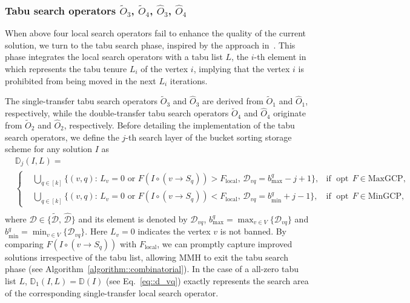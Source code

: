 \documentclass[12pt, a4paper]{article}%
\DeclareMathOperator*{\opt}{\ensuremath{opt}}
\numberwithin{equation}{section}
\theoremstyle{plain}
\begin{document}
			
			
			
			
			
			
			
			
			
			
			\subsubsection{Tabu search operators $\widetilde{O}_3$, $\widetilde{O}_4$, $\widehat{O}_3$, $\widehat{O}_4$}
			\label{sec::tabu}
			
			When above four local search operators fail to enhance the quality of the current solution, we turn to the tabu search phase, inspired by the approach in~\cite{Ma2015}. This phase integrates the local search operators with a tabu list $L$, the $i$-th element in which represents the tabu tenure $L_i$ of the vertex $i$, implying that the vertex $i$ is prohibited from being moved in the next $L_i$ iterations. 
			
			
			The single-transfer tabu search operators  $\widetilde{O}_3$ and $\widehat{O}_3$ are derived from $\widetilde{O}_1$ and $\widehat{O}_1$, respectively, while the double-transfer tabu search operators $\widetilde{O}_4$ and $\widehat{O}_4$ originate from $\widetilde{O}_2$ and $\widehat{O}_2$, respectively. Before detailing the implementation of the tabu search operators, we define the $j$-th search layer of the bucket sorting storage scheme for any solution $I$ as 
			\begin{equation}
				\label{choice::j-layer}
				\begin{aligned}
					&\mathbb{D}_j(I,L)=\\
					&\left\{
					\begin{aligned}
						&\bigcup_{q\in [k]}\{(v,q):\,L_v=0\text{ or }F(I\circ (v\rightarrow S_q))>F_{\text{local}},\, \mathcal{D}_{vq}=b_{\max}^q-j+1\}, &
						\text{if }\opt\, F\in\text{MaxGCP},\\
						&\bigcup_{q\in [k]}\{(v,q):\,L_v=0\text{ or }F(I\circ (v\rightarrow S_q))<F_{\text{local}},\,\mathcal{D}_{vq}=b_{\min}^q+j-1\}, &
						\text{if }\opt\, F\in\text{MinGCP},
					\end{aligned}
					\right.\\
				\end{aligned}
			\end{equation}
			where $\mathcal{D}\in\{\widetilde{\mathcal{D}},\,\widehat{\mathcal{D}}\}$ and its element is denoted by $\mathcal{D}_{vq}$, $b_{\max}^q=\max_{v\in V}\{\mathcal{D}_{vq}\}$ and $b_{\min}^q=\min_{v\in V}\{\mathcal{D}_{vq}\}$. Here $L_v=0$ indicates the vertex $v$ is not banned. By comparing $F(I\circ (v\rightarrow S_q))$ with $F_{\text{local}}$, we can promptly capture improved solutions irrespective of the tabu list, allowing MMH to exit the tabu search phase (see Algorithm~\ref{algorithm::combinatorial}). In the case of a all-zero tabu list $L$, $\mathbb{D}_1(I,L)=\mathbb{D}(I)$ (see Eq.~\eqref{eq::d_vq}) exactly represents the search area of the corresponding single-transfer local search operator.
			
\end{document}
